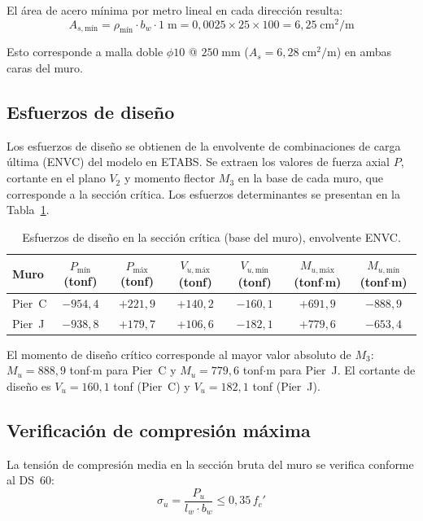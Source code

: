El área de acero mínima por metro lineal en cada dirección resulta:
\begin{equation}
    A_{s,\text{mín}} = \rho_{\text{mín}} \cdot b_w \cdot 1\;\text{m}
    = 0{,}0025 \times 25 \times 100 = 6{,}25\;\text{cm}^2/\text{m}
\end{equation}

Esto corresponde a malla doble $\phi10$ @ $250\;\text{mm}$ ($A_s = 6{,}28\;\text{cm}^2/\text{m}$)
en ambas caras del muro.

\subsection{Esfuerzos de diseño}

Los esfuerzos de diseño se obtienen de la envolvente de combinaciones de carga última (ENVC)
del modelo en ETABS. Se extraen los valores de fuerza axial $P$, cortante en el plano $V_2$ y
momento flector $M_3$ en la base de cada muro, que corresponde a la sección crítica. Los
esfuerzos determinantes se presentan en la Tabla~\ref{tab:muro_esfuerzos}.

\begin{table}[H]
\centering
\caption{Esfuerzos de diseño en la sección crítica (base del muro), envolvente ENVC.}
\label{tab:muro_esfuerzos}
\begin{tabular}{lcccccc}
\hline
Muro & $P_{\text{mín}}$ (tonf) & $P_{\text{máx}}$ (tonf) & $V_{u,\text{máx}}$ (tonf) & $V_{u,\text{mín}}$ (tonf) & $M_{u,\text{máx}}$ (tonf$\cdot$m) & $M_{u,\text{mín}}$ (tonf$\cdot$m) \\
\hline
Pier~C & $-954{,}4$ & $+221{,}9$ & $+140{,}2$ & $-160{,}1$ & $+691{,}9$ & $-888{,}9$ \\
Pier~J & $-938{,}8$ & $+179{,}7$ & $+106{,}6$ & $-182{,}1$ & $+779{,}6$ & $-653{,}4$ \\
\hline
\end{tabular}
\end{table}

El momento de diseño crítico corresponde al mayor valor absoluto de $M_3$: $M_u = 888{,}9$
tonf$\cdot$m para Pier~C y $M_u = 779{,}6$ tonf$\cdot$m para Pier~J. El cortante de diseño
es $V_u = 160{,}1$ tonf (Pier~C) y $V_u = 182{,}1$ tonf (Pier~J).

\subsection{Verificación de compresión máxima}

La tensión de compresión media en la sección bruta del muro se verifica conforme al DS~60:
\begin{equation}
    \sigma_u = \frac{P_u}{l_w \cdot b_w} \leq 0{,}35\,f_c'
\end{equation}


